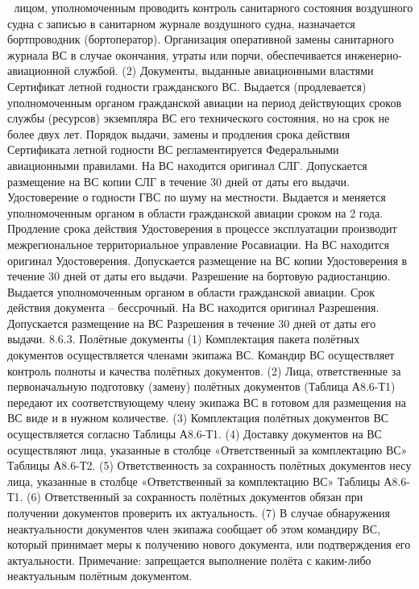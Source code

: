 	лицом, уполномоченным проводить контроль санитарного состояния воздушного судна с записью в санитарном журнале воздушного судна, назначается бортпроводник (бортоператор). 
Организация оперативной замены санитарного журнала ВС в случае окончания, утраты или порчи, обеспечивается инженерно-авиационной службой.
           (2)  Документы, выданные авиационными властями Сертификат летной годности 
                                                                гражданского ВС.
Выдается (продлевается) уполномоченным органом гражданской авиации на период действующих сроков службы (ресурсов) экземпляра ВС его технического состояния, но на срок не более двух лет.
Порядок выдачи, замены и продления срока действия Сертификата летной годности ВС регламентируется Федеральными авиационными правилами. 
 На ВС находится оригинал СЛГ. Допускается размещение на ВС копии СЛГ в течение 30 дней от даты его выдачи.
Удостоверение о годности ГВС по шуму на местности.
Выдается и меняется уполномоченным органом в области гражданской авиации сроком на 2 года.
Продление срока действия Удостоверения в процессе эксплуатации производит межрегиональное территориальное управление Росавиации.
На ВС находится оригинал Удостоверения. Допускается размещение на ВС копии Удостоверения в течение 30 дней от даты его выдачи.
Разрешение на бортовую радиостанцию.
Выдается уполномоченным органом в области гражданской авиации. Срок действия документа – бессрочный. 
На ВС находится оригинал Разрешения. Допускается размещение на ВС Разрешения в течение 30 дней от даты его выдачи.
8.6.3. Полётные документы
(1)	Комплектация пакета полётных документов осуществляется членами экипажа ВС. Командир ВС осуществляет контроль полноты и качества полётных документов. 
(2)	Лица, ответственные за первоначальную подготовку (замену) полётных документов (Таблица А8.6-Т1) передают их соответствующему члену экипажа ВС в готовом для размещения на ВС виде и в нужном количестве. 
(3)	Комплектация полётных документов ВС осуществляется согласно Таблицы А8.6-Т1. 
(4)	Доставку документов на ВС осуществляют лица, указанные в столбце «Ответственный за комплектацию ВС» Таблицы А8.6-Т2.
(5)	Ответственность за сохранность полётных документов несу лица, указанные в столбце «Ответственный за комплектацию ВС» Таблицы А8.6-Т1.
(6)	Ответственный за сохранность полётных документов обязан при получении документов проверить их актуальность.
(7)	В случае обнаружения неактуальности документов член экипажа сообщает об этом командиру ВС, который принимает меры к получению нового документа, или подтверждения его актуальности. 
Примечание: запрещается выполнение полёта с каким-либо неактуальным полётным документом.
